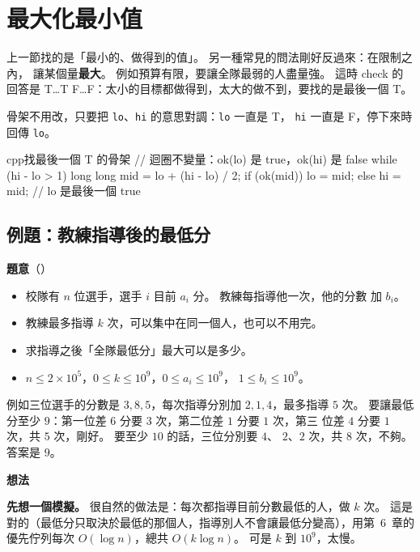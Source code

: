 \section{最大化最小值}
\label{sec:bs-maxmin}

上一節找的是「最小的、做得到的值」。 另一種常見的問法剛好反過來：在限制之內，
讓某個量\textbf{最大}。 例如預算有限，要讓全隊最弱的人盡量強。 這時 check 的
回答是 T…T F…F：太小的目標都做得到，太大的做不到，要找的是最後一個 T。

骨架不用改，只要把 \texttt{lo}、\texttt{hi} 的意思對調：\texttt{lo} 一直是 T，
\texttt{hi} 一直是 F，停下來時回傳 \texttt{lo}。

\begin{code}{cpp}{找最後一個 T 的骨架}
// 迴圈不變量：ok(lo) 是 true，ok(hi) 是 false
while (hi - lo > 1) {
    long long mid = lo + (hi - lo) / 2;
    if (ok(mid)) {
        lo = mid;
    } else {
        hi = mid;
    }
}
// lo 是最後一個 true
\end{code}

\subsection{例題：教練指導後的最低分}
\label{sec:ex-coach}

\textbf{題意}（）

\begin{itemize}
\item 校隊有 $n$ 位選手，選手 $i$ 目前 $a_i$ 分。 教練每指導他一次，他的分數
加 $b_i$。
\item 教練最多指導 $k$ 次，可以集中在同一個人，也可以不用完。
\item 求指導之後「全隊最低分」最大可以是多少。
\item $n \le 2 \times 10^5$，$0 \le k \le 10^9$，$0 \le a_i \le 10^9$，
$1 \le b_i \le 10^9$。
\end{itemize}

例如三位選手的分數是 $3, 8, 5$，每次指導分別加 $2, 1, 4$，最多指導 $5$ 次。
要讓最低分至少 $9$：第一位差 $6$ 分要 $3$ 次，第二位差 $1$ 分要 $1$ 次，第三
位差 $4$ 分要 $1$ 次，共 $5$ 次，剛好。 要至少 $10$ 的話，三位分別要 $4$、
$2$、$2$ 次，共 $8$ 次，不夠。 答案是 $9$。

\textbf{想法}

\textbf{先想一個模擬。} 很自然的做法是：每次都指導目前分數最低的人，做 $k$ 次。
這是對的（最低分只取決於最低的那個人，指導別人不會讓最低分變高），用第~6~章的
優先佇列每次 $O(\log n)$，總共 $O(k \log n)$。 可是 $k$ 到 $10^9$，太慢。

